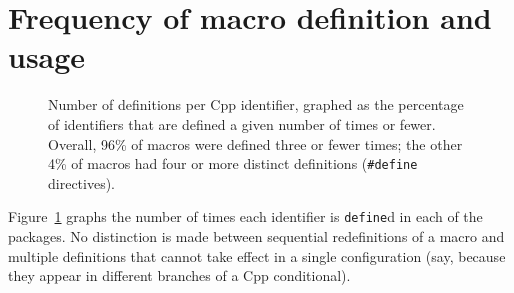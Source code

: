 \documentclass[11pt]{article}
\begin{document}
\section{Frequency of macro definition and usage}
\label{sec:usage}


%
%



\begin{figure}
\centerline{}
\caption{Number of definitions per Cpp identifier, graphed as
  the percentage of identifiers that are defined a given number of times
  or fewer.  Overall, 96\% of macros were defined three or
  fewer times; the other 4\% of macros had four or more distinct
  definitions ({\tt \#define} directives).}
\label{fig:freq-def}
\end{figure}

Figure~\ref{fig:freq-def} graphs the number of times each identifier is
{\tt define}d in each of the packages.  No distinction is made between
sequential redefinitions of a macro and multiple definitions that cannot
take effect in a single configuration (say, because they appear in
different branches of a Cpp conditional).
\end{document}
